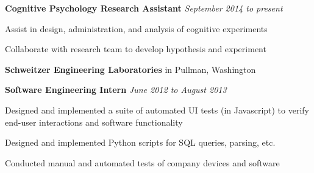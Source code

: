 \documentclass[12pt]{article}
\newcommand{\gdotfill}{\textcolor{lightgray}{\dotfill}}
\newenvironment{innerlist}[1][\enskip\textbullet]%
        {\begin{compactitem}[#1]}{\end{compactitem}}
\begin{document}
	\smallskip
	
	\begin{innerlist}
		\item[] \textbf{Cognitive Psychology Research Assistant}
		\gdotfill \textit{September 2014 to present}
		\begin{innerlist}
			\item {Assist in design, administration, and analysis of cognitive experiments}
			\item {Collaborate with research team to develop hypothesis and experiment}
		\end{innerlist}
		
	\end{innerlist}
	
	\medskip
	
	\textbf{Schweitzer Engineering Laboratories} in Pullman, Washington
	
	\smallskip
	
	\begin{innerlist}
		\item[] \textbf{Software Engineering Intern}
		\gdotfill \textit{June 2012 to August 2013}
		\begin{innerlist}
			\item {Designed and implemented a suite of automated UI tests (in Javascript) to verify end-user interactions and software functionality}
			\item {Designed and implemented Python scripts for SQL queries, parsing, etc.}
			\item {Conducted manual and automated tests of company devices and software}
		\end{innerlist}
	\end{innerlist}
	
	
	

	
	\bigskip
		
\end{document}
